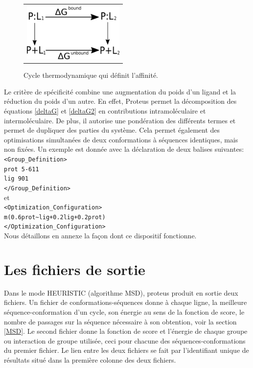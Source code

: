    \begin{figure}[!htbp]
     \centering
     \begin{tabular}{c}
       \includegraphics[width=5cm]{figure/cycleThermoLigand.pdf} 
     \end{tabular}
     \caption{Cycle thermodynamique qui définit l'affinité.}
\label{fig:cycleThermoLigand}
   \end{figure}
Le critère de spécificité combine une augmentation du poids d'un ligand et la réduction du poids d'un autre. En effet, Proteus permet la décomposition des équations \ref{deltaG} et \ref{deltaG2} en contributions intramoléculaire et intermoléculaire. De plus, il autorise une pondération des différents termes et permet de dupliquer des parties du système. Cela permet également des optimisations simultanées de deux conformations à séquences identiques, mais non fixées. Un exemple est donnée avec la déclaration de deux balises suivantes:\\
\verb!<Group_Definition>!\\
\verb!prot 5-611!\\
\verb!lig 901!\\
\verb!</Group_Definition>!\\
et\\
\verb!<Optimization_Configuration>!\\
\verb!m(0.6prot~lig+0.2lig+0.2prot)!\\
\verb!</Optimization_Configuration>!\\
Nous détaillons en annexe la façon dont ce dispositif fonctionne.

\section{Les fichiers de sortie}
\label{proteusIO}
Dans le mode HEURISTIC (algorithme MSD), proteus produit en sortie deux fichiers. Un fichier de conformations-séquences donne à chaque ligne, la meilleure séquence-conformation d'un cycle, son énergie au sens de la fonction de score, le nombre de passages sur la séquence nécessaire à son obtention, voir la section \vref{MSD}. Le second fichier donne la fonction de score et l'énergie de chaque groupe ou interaction de groupe utilisée, ceci pour chacune des séquences-conformations du premier fichier. Le lien entre les deux fichiers se fait par l'identifiant unique de résultats situé dans la première colonne des deux fichiers.

